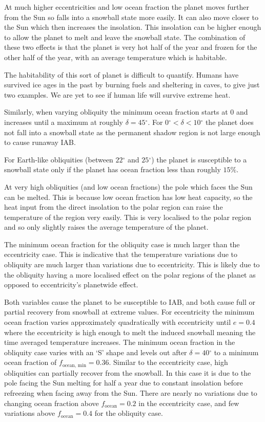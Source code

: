 \documentclass[12pt, onecolumn]{revtex4-2}    %
\newcommand{\degrees}{\ensuremath{^{\circ}}}
\begin{document}
At much higher eccentricities and low ocean fraction the planet moves further from the Sun so falls into a snowball state more easily.
It can also move closer to the Sun which then increases the insolation.
This insolation can be higher enough to allow the planet to melt and leave the snowball state.
The combination of these two effects is that the planet is very hot half of the year and frozen for the other half of the year, with an average temperature which is habitable.

The habitability of this sort of planet is difficult to quantify.
Humans have survived ice ages in the past by burning fuels and sheltering in caves, to give just two examples.
We are yet to see if human life will survive extreme heat.

Similarly, when varying obliquity the minimum ocean fraction starts at 0 and increases until a maximum at roughly $\delta = 45\degrees$.
For $0\degrees < \delta < 10\degrees$ the planet does not fall into a snowball state as the permanent shadow region is not large enough to cause runaway IAB.

For Earth-like obliquities (between $22\degrees$ and $25\degrees$) the planet is susceptible to a snowball state only if the planet has ocean fraction less than roughly $15\%$.

At very high obliquities (and low ocean fractions) the pole which faces the Sun can be melted.
This is because low ocean fraction has low heat capacity, so the heat input from the direct insolation to the polar region can raise the temperature of the region very easily.
This is very localised to the polar region and so only slightly raises the average temperature of the planet.

The minimum ocean fraction for the obliquity case is much larger than the eccentricity case.
This is indicative that the temperature variations due to obliquity are much larger than variations due to eccentricity.
This is likely due to the obliquity having a more localised effect on the polar regions of the planet as opposed to eccentricity's planetwide effect.

Both variables cause the planet to be susceptible to IAB, and both cause full or partial recovery from snowball at extreme values.
For eccentricity the minimum ocean fraction varies approximately quadratically with eccentricity until $e = 0.4$ where the eccentricity is high enough to melt the induced snowball meaning the time averaged temperature increases.
The minimum ocean fraction in the obliquity case varies with an `S' shape and levels out after $\delta = 40\degrees$ to a minimum ocean fraction of $f_\text{ocean, min} = 0.36$.
Similar to the eccentricity case, high obliquities can partially recover from the snowball. In this case it is due to the pole facing the Sun melting for half a year due to constant insolation before refreezing when facing away from the Sun.
There are nearly no variations due to changing ocean fraction above $f_\text{ocean} = 0.2$ in the eccentricity case, and few variations above $f_\text{ocean} = 0.4$ for the obliquity case.
\end{document}
